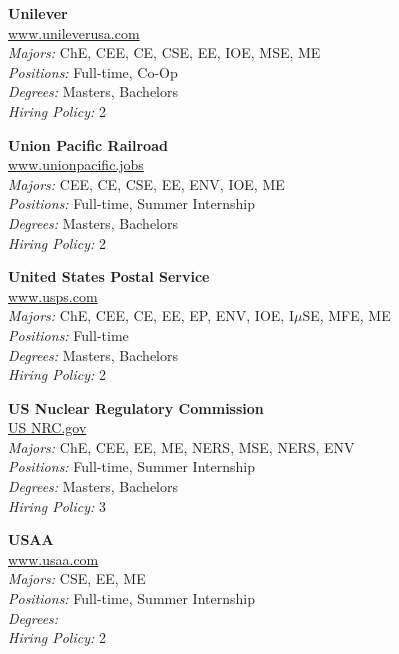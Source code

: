 \documentclass[twoside]{article}
\begin{document}
\begin{center}
\begin{multicols}{3}
\begin{minipage}{.9\columnwidth}{\Large\bf Unilever }\\
	\url{www.unileverusa.com}\\
	\emph{Majors:} ChE, CEE, CE, CSE, EE, IOE, MSE, ME\\
	\emph{Positions:} Full-time, Co-Op\\
	\emph{Degrees:} Masters, Bachelors\\
	\emph{Hiring Policy:} 2\\
\end{minipage}
 
\begin{minipage}{.9\columnwidth}{\Large\bf Union Pacific Railroad }\\
	\url{www.unionpacific.jobs}\\
	\emph{Majors:} CEE, CE, CSE, EE, ENV, IOE, ME\\
	\emph{Positions:} Full-time, Summer Internship\\
	\emph{Degrees:} Masters, Bachelors\\
	\emph{Hiring Policy:} 2\\
\end{minipage}
 
\begin{minipage}{.9\columnwidth}{\Large\bf United States Postal Service }\\
	\url{www.usps.com}\\
	\emph{Majors:} ChE, CEE, CE, EE, EP, ENV, IOE, I$\mu$SE, MFE, ME\\
	\emph{Positions:} Full-time\\
	\emph{Degrees:} Masters, Bachelors\\
	\emph{Hiring Policy:} 2\\
\end{minipage}
 
\begin{minipage}{.9\columnwidth}{\Large\bf US Nuclear Regulatory Commission }\\
	\url{US NRC.gov}\\
	\emph{Majors:} ChE, CEE, EE, ME, NERS, MSE, NERS, ENV\\
	\emph{Positions:} Full-time, Summer Internship\\
	\emph{Degrees:} Masters, Bachelors\\
	\emph{Hiring Policy:} 3\\
\end{minipage}
 
\begin{minipage}{.9\columnwidth}{\Large\bf USAA }\\
	\url{www.usaa.com}\\
	\emph{Majors:} CSE, EE, ME\\
	\emph{Positions:} Full-time, Summer Internship\\
	\emph{Degrees:} \\
	\emph{Hiring Policy:} 2\\
\end{minipage}
 

\end{multicols}
\end{center}
\end{document}
